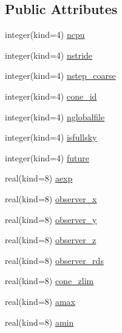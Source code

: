 \subsection*{Public Attributes}
\begin{DoxyCompactItemize}
\item 
integer(kind=4) \hyperlink{structmodconstant_1_1type__infocone_a2085f6dfc0dfa44c312c1f92021a08c3}{ncpu}
\item 
integer(kind=4) \hyperlink{structmodconstant_1_1type__infocone_a0518cd3191a67331de40dd13f19345b0}{nstride}
\item 
integer(kind=4) \hyperlink{structmodconstant_1_1type__infocone_aa36e3d7e8b1cfd9a111b897917567ad5}{nstep\+\_\+coarse}
\item 
integer(kind=4) \hyperlink{structmodconstant_1_1type__infocone_aef4e47022a667b8d2dad299fe132fd5c}{cone\+\_\+id}
\item 
integer(kind=4) \hyperlink{structmodconstant_1_1type__infocone_a08b0aed7e8b71197bd6f73439a343883}{nglobalfile}
\item 
integer(kind=4) \hyperlink{structmodconstant_1_1type__infocone_adb5bd3dc9f5e4b1ed2b0b10b14c7fe23}{isfullsky}
\item 
integer(kind=4) \hyperlink{structmodconstant_1_1type__infocone_a1fcb4dfca22f5cdb9979317636506751}{future}
\item 
real(kind=8) \hyperlink{structmodconstant_1_1type__infocone_ac3a5d891e4c144a6391de4445dd2e675}{aexp}
\item 
real(kind=8) \hyperlink{structmodconstant_1_1type__infocone_af67a9e1949f9edead87e1c7bce004c5c}{observer\+\_\+x}
\item 
real(kind=8) \hyperlink{structmodconstant_1_1type__infocone_a2b4f02168657948cb408c35f98263029}{observer\+\_\+y}
\item 
real(kind=8) \hyperlink{structmodconstant_1_1type__infocone_a05bd00def00e396390e75c97d9e171b8}{observer\+\_\+z}
\item 
real(kind=8) \hyperlink{structmodconstant_1_1type__infocone_a5ce5f0baded3372b6802b32a689cf571}{observer\+\_\+rds}
\item 
real(kind=8) \hyperlink{structmodconstant_1_1type__infocone_ae9da46dfd6bb0ce1670e30f549e35b96}{cone\+\_\+zlim}
\item 
real(kind=8) \hyperlink{structmodconstant_1_1type__infocone_a4f92a39c770ead2115957fb7e05ce22a}{amax}
\item 
real(kind=8) \hyperlink{structmodconstant_1_1type__infocone_a4c48af6759d2e76017ed219c17b488ff}{amin}
\item 

\end{DoxyCompactItemize}
